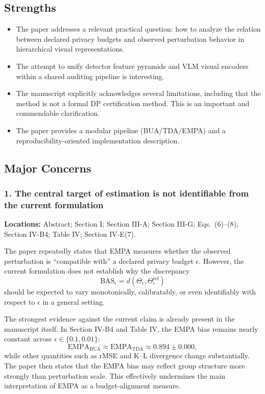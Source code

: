 \subsection*{Strengths}
\begin{itemize}
    \item The paper addresses a relevant practical question: how to analyze the relation between declared privacy budgets and observed perturbation behavior in hierarchical visual representations.
    \item The attempt to unify detector feature pyramids and VLM visual encoders within a shared auditing pipeline is interesting.
    \item The manuscript explicitly acknowledges several limitations, including that the method is not a formal DP certification method. This is an important and commendable clarification.
    \item The paper provides a modular pipeline (BUA/TDA/EMPA) and a reproducibility-oriented implementation description.
\end{itemize}

\subsection*{Major Concerns}

\subsubsection*{1. The central target of estimation is not identifiable from the current formulation}
\textbf{Locations:} Abstract; Section I; Section III-A; Section III-G; Eqs.~(6)--(8); Section IV-B4; Table IV; Section IV-E(7).

The paper repeatedly states that EMPA measures whether the observed perturbation is ``compatible with'' a declared privacy budget $\epsilon$. However, the current formulation does not establish why the discrepancy
\begin{equation}
\mathrm{BAS}_{\epsilon} = d\!\left(\Theta_{\epsilon}, \Theta^{\mathrm{ref}}_{\epsilon}\right)
\end{equation}
should be expected to vary monotonically, calibratably, or even identifiably with respect to $\epsilon$ in a general setting.

The strongest evidence against the current claim is already present in the manuscript itself. In Section IV-B4 and Table IV, the EMPA bias remains nearly constant across $\epsilon \in \{0.1, 0.01\}$:
\begin{equation}
\mathrm{EMPA}_{\mathrm{BUA}} \approx \mathrm{EMPA}_{\mathrm{TDA}} \approx 0.894 \pm 0.000,
\end{equation}
while other quantities such as rMSE and K--L divergence change substantially. The paper then states that the EMPA bias may reflect group structure more strongly than perturbation scale. This effectively undermines the main interpretation of EMPA as a budget-alignment measure.

